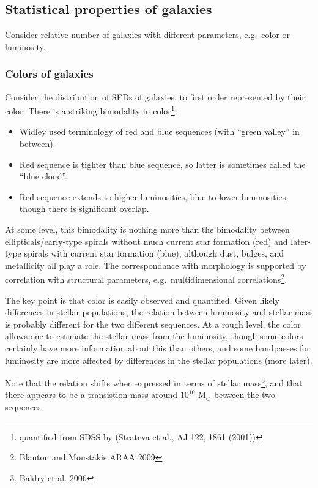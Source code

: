 \documentclass{article}
\begin{document}
\subsection{Statistical properties of galaxies}
Consider relative number of galaxies with different parameters,
e.g.\ color or luminosity.

\subsubsection{Colors of galaxies}
Consider the distribution of SEDs of galaxies, to first order represented by
their color. There is a striking bimodality in color\footnote{quantified from SDSS
by (Strateva et al., AJ 122, 1861 (2001))}:
\begin{itemize}
    \item Widley used terminology of red and blue sequences
        (with ``green valley'' in between).
    \item Red sequence is tighter than blue sequence, so latter is
        sometimes called the ``blue cloud''.
    \item Red sequence extends to higher luminosities, blue to lower
        luminosities, though there is significant overlap.
\end{itemize}
At some level, this bimodality is nothing more than the bimodality between
ellipticals/early-type spirals without much current star formation (red)
and later-type spirals with current star formation (blue), although
dust, bulges, and metallicity all play a role.
The correspondance with morphology is supported
by correlation with structural parameters, e.g.\ multidimensional
correlations\footnote{Blanton and Moustakis ARAA 2009}.

The key point is that color is easily observed and quantified. Given likely
differences in stellar populations, the relation between luminosity and stellar
mass is probably different for the two different sequences. At a rough level,
the color allows one to estimate the stellar mass from the luminosity, though
some colors certainly have more information about this than others, and some
bandpasses for luminosity are more affected by differences in the stellar
populations (more later).

Note that the relation shifts when expressed in terms of stellar
mass\footnote{Baldry et al. 2006}, and that there appears to be a transistion
mass around $10^{10}$ M$_{\odot}$ between the two sequences.
\end{document}
